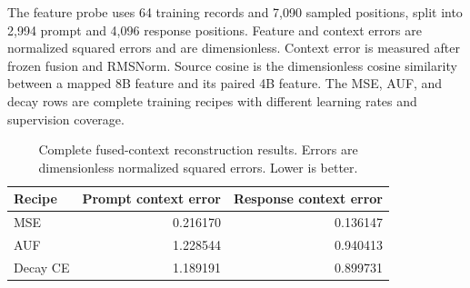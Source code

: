 The feature probe uses 64 training records and 7,090 sampled positions, split into 2,994 prompt and 4,096 response positions. Feature and context errors are normalized squared errors and are dimensionless. Context error is measured after frozen fusion and RMSNorm. Source cosine is the dimensionless cosine similarity between a mapped 8B feature and its paired 4B feature. The MSE, AUF, and decay rows are complete training recipes with different learning rates and supervision coverage.

\begin{table}[ht!]
\centering
\caption{Complete fused-context reconstruction results. Errors are dimensionless normalized squared errors. Lower is better.}
\label{tab:app-context-geometry}
\small
\begin{tabular}{lrr}
\toprule
Recipe & Prompt context error & Response context error \\
\midrule
MSE & 0.216170 & 0.136147 \\
AUF & 1.228544 & 0.940413 \\
Decay CE & 1.189191 & 0.899731 \\
\bottomrule
\end{tabular}
\end{table}

